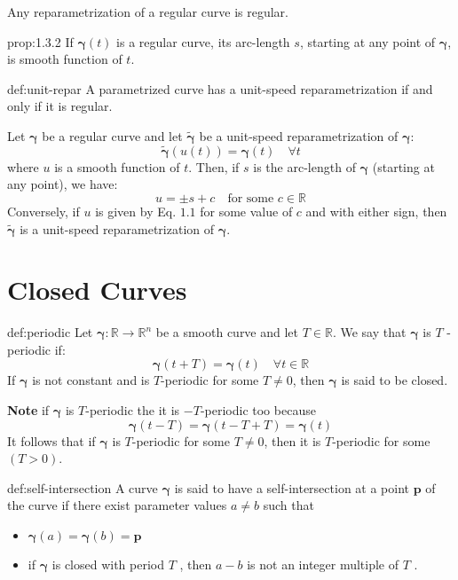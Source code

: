 \documentclass{notes}
\begin{document}
\begin{proposition}{}
	Any reparametrization of a regular curve is regular.
\end{proposition}
\begin{proposition}{prop:1.3.2}
	If \(\bm{\gamma}(t)\) is a regular curve, its arc-length \(s\), starting at any point of \(\bm{\gamma}\), is smooth function of \(t\).
\end{proposition}


\begin{theorem}{def:unit-repar}
	A parametrized curve has a unit-speed reparametrization if and only if it is
	regular.
\end{theorem}
\begin{corollary}{1}
	Let \(\bm{\gamma}\) be a regular curve and let \(\tilde{\bm{\gamma}}\) be a unit-speed reparametrization of \(\bm{\gamma}\):
	\[\tilde{\bm{\gamma}}(u(t)) = \bm{\gamma}(t) \quad \forall t\]
	where \(u\) is a smooth function of \(t\). Then, if \(s\) is the arc-length of \(\bm{\gamma}\) (starting at any point), we have:
	\[u = \pm s + c \quad \text{for some } c \in \mathbb{R} \tag*{(1.1)}\]
	Conversely, if \(u\) is given by Eq. \(1.1\) for some value of \(c\)
	and with either sign, then \(\tilde{\bm{\gamma}}\) is a unit-speed reparametrization of \(\bm{\gamma}\).
\end{corollary}
\section{Closed Curves}

\begin{definition}{def:periodic}
	Let \(\bm{\gamma}: \mathbb{R} \to \mathbb{R}^n\) be a smooth curve and let \(T \in \mathbb{R}\). We say that \(\bm{\gamma}\) is
	\(T\) -periodic if:
	\[\bm{\gamma}(t +T) = \bm{\gamma}(t) \quad \forall t\in \mathbb{R}\]
	If \(\bm{\gamma}\) is not constant and is \(T\)-periodic for some \(T \not = 0\), then \(\bm{\gamma}\) is said to be closed.
	
	\textbf{Note} if \(\bm{\gamma}\) is \(T\)-periodic the it is \(-T\)-periodic too because
	\[\bm{\gamma}(t - T) = \bm{\gamma}(t -T + T) = \bm{\gamma}(t)\]
	It follows that if \(\bm{\gamma}\) is \(T\)-periodic for some \(T \not = 0\), then it is \(T\)-periodic for some
	$(T > 0)$.
\end{definition}

\begin{definition}{def:self-intersection}
	A curve \(\bm{\gamma}\) is said to have a self-intersection at a point \(\mathbf{p}\) of the curve if there
	exist parameter values \(a \not = b\) such that
	\begin{itemize}
		\item \(\bm{\gamma}(a) =\bm{\gamma}(b) = \mathbf{p} \)
		\item if \(\bm{\gamma}\) is closed with period \(T\) , then \(a - b\) is not an integer multiple of \(T\) .
	\end{itemize}
\end{definition}
\end{document}
